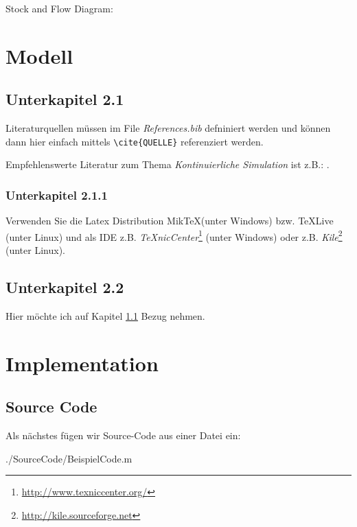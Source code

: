 \documentclass[a4paper,11pt]{scrartcl}
\begin{document}
Stock and Flow Diagram: \\

\section{Modell}

\subsection{Unterkapitel 2.1}
\label{sec:Unterkapitel21}
 Literaturquellen müssen im File \textit{References.bib} defniniert werden und können
 dann hier einfach mittels \verb|\cite{QUELLE}| referenziert werden.

 Empfehlenswerte Literatur zum Thema \emph{Kontinuierliche Simulation} ist z.B.:
 \cite{CK06}.

\subsubsection{Unterkapitel 2.1.1}
 Verwenden Sie die Latex Distribution Mik\TeX (unter Windows) bzw. \TeX  Live (unter Linux)
 und als IDE z.B. \emph{\TeX nicCenter}\footnote{\url{http://www.texniccenter.org/}} (unter Windows)
 oder z.B. \emph{Kile}\footnote{\url{http://kile.sourceforge.net}} (unter Linux).

\subsection{Unterkapitel 2.2}
Hier möchte ich auf Kapitel \ref{sec:Unterkapitel21} Bezug nehmen.

\section{Implementation}

\subsection{Source Code}

Als nächstes fügen wir Source-Code aus einer Datei ein:

  {./SourceCode/BeispielCode.m}
\end{document}
